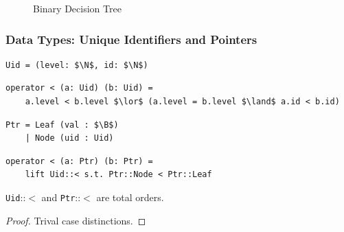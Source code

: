 \documentclass[english, aspectratio=169]{beamer}
\newcommand{\B}[0]{\ensuremath{\mathbb{B}}}
\begin{document}
\begin{frame}
{\begin{figure}
      \caption{Binary Decision Tree}
    \end{figure}
  }

\end{frame}

\begin{frame}[fragile]
  \frametitle{Data Types: Unique Identifiers and Pointers}

  \begin{lstlisting}
Uid = (level: $\N$, id: $\N$)
  \end{lstlisting}
  \begin{lstlisting}[firstnumber=2]
operator < (a: Uid) (b: Uid) =
    a.level < b.level $\lor$ (a.level = b.level $\land$ a.id < b.id)
  \end{lstlisting}

  \begin{lstlisting}[firstnumber=4]
Ptr = Leaf (val : $\B$)
    | Node (uid : Uid)
  \end{lstlisting}
  \begin{lstlisting}[firstnumber=5]
operator < (a: Ptr) (b: Ptr) =
    lift Uid::< s.t. Ptr::Node < Ptr::Leaf
  \end{lstlisting}

  \begin{lemma}
    \texttt{Uid}::$<$ and \texttt{Ptr}::$<$ are total orders.
  \end{lemma}
  \begin{proof}
    Trival case distinctions.
  \end{proof}
\end{frame}
\end{document}
